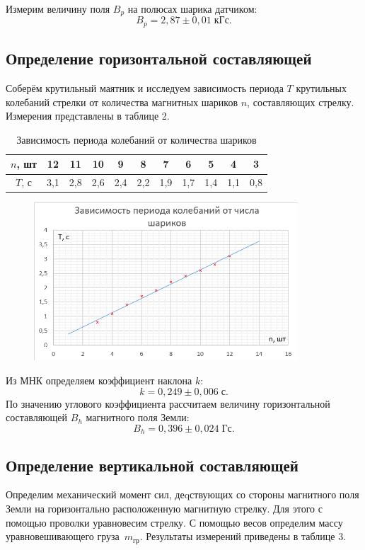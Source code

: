 \documentclass[a4paper]{article}
\theoremstyle{definition}
\theoremstyle{remark}
\begin{document}
Измерим величину поля $B_p$ на полюсах шарика датчиком: $$B_p = 2,87 \pm 0,01 \;\text{кГс}.$$

\subsection{Определение горизонтальной составляющей}

Соберём крутильный маятник и исследуем зависимость периода $T$ крутильных колебаний стрелки от количества магнитных шариков $n$, составляющих стрелку. Измерения представлены в таблице 2.

\begin{table}[h!]
    \centering
    \begin{tabular}{|c|c|c|c|c|c|c|c|c|c|c|}
    \hline
    $n$, шт & 12  & 11  & 10  & 9   & 8   & 7   & 6   & 5   & 4   & 3   \\ \hline
    $T$, с  & 3,1 & 2,8 & 2,6 & 2,4 & 2,2 & 1,9 & 1,7 & 1,4 & 1,1 & 0,8 \\ \hline
    \end{tabular}
    \caption{Зависимость периода колебаний от количества шариков}
    \end{table}


    \begin{figure}[t]
        \centering
        \includegraphics[width = 280pt]{image/graph1.png}
    \end{figure}


    Из МНК определяем коэффициент наклона $k$: $$k = 0,249 \pm 0,006 \; \text{с}.$$ По значению углового коэффициента рассчитаем величину горизонтальной составляющей $B_h$ магнитного поля Земли: $$B_h = 0,396 \pm  0,024\;\text{Гс}.$$


\subsection{Определение вертикальной составляющей}

Определим механический момент сил, деqствующих со стороны магнитного поля Земли на горизонтально расположенную магнитную стрелку. Для этого с помощью проволки уравновесим стрелку. С помощью весов определим массу уравновешивающего груза~$m_{\text{гр}}$. Результаты измерений приведены в таблице 3.
\end{document}
